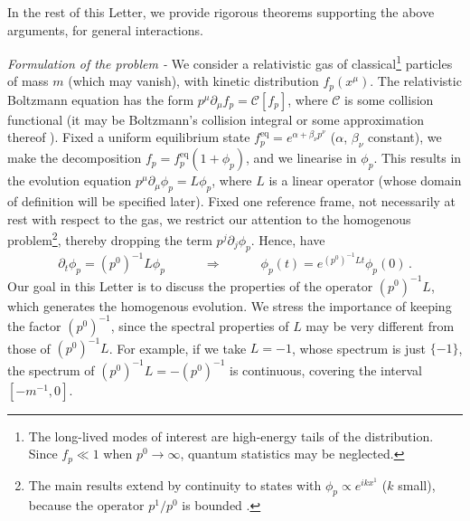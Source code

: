 \documentclass[a4paper, amsfonts, amssymb, amsmath, reprint, showkeys, nofootinbib, twoside, onecolumn,notitlepage,,longbibliography]{revtex4-2}
\newcommand{\spc}{\quad \quad \quad}
\theoremstyle{definition}
\theoremstyle{theorem}
\theoremstyle{corollary}
\begin{document}
\newpage

In the rest of this Letter, we provide rigorous theorems supporting the above arguments, for general interactions. 

\noindent \textit{Formulation of the problem -} We consider a relativistic gas of classical\footnote{The long-lived modes of interest are high-energy tails of the distribution. Since $f_p {\ll} 1$ when $p^0 {\rightarrow} \infty$, quantum statistics may be neglected.} particles of mass $m$ (which may vanish), with kinetic distribution $f_p(x^\mu)$. The relativistic Boltzmann equation \cite{Groot1980RelativisticKT} has the form $p^\mu \partial_\mu f_p=\mathcal{C}[f_p]$, where $\mathcal{C}$ is some collision functional (it may be Boltzmann's collision integral or some approximation thereof \cite{Cercignani}). Fixed a uniform equilibrium state $f_p^{\text{eq}}=e^{\alpha +\beta_\nu p^\nu}$ ($\alpha$, $\beta_\nu$ constant), we make the decomposition $f_p=f_p^{\text{eq}}(1+\phi_p)$, and we linearise in $\phi_p$. This results in the evolution equation $p^\mu \partial_\mu \phi_p=L\phi_p$, where $L$ is a linear operator (whose domain of definition will be specified later). Fixed one reference frame, not necessarily at rest with respect to the gas, we restrict our attention to the homogenous problem\footnote{The main results extend by continuity to states with $\phi_p \propto e^{ikx^1}$ ($k$ small), because the operator $p^1/p^0$ is bounded \cite[Chapter 5, \S 4.3]{Kato_book}.}, thereby dropping the term $p^j \partial_j \phi_p$. Hence, have
\begin{equation}\label{frittata}
 \partial_t \phi_p =  (p^0)^{-1} L \phi_p \spc \Longrightarrow \spc \phi_p(t)=e^{(p^0)^{-1}L t}\phi_p(0) \, .
\end{equation}
Our goal in this Letter is to discuss the properties of the operator $(p^0)^{-1}L$, which generates the homogenous evolution.
We stress the importance of keeping the factor $(p^0)^{-1}$, since the spectral properties of $L$ may be very different from those of $(p^0)^{-1}L$. For example, if we take $L=-1$, whose spectrum is just $\{-1\}$,  the spectrum of $(p^0)^{-1}L=-(p^0)^{-1}$ is continuous, covering the interval $[-m^{-1},0]$. 
\end{document}
